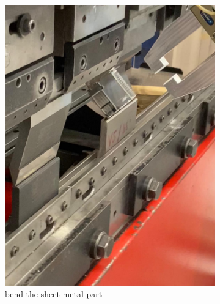 \begin{figure}[h]
\begin{subfigure}[b]{0.32\textwidth}
        \includegraphics[width=\textwidth]{figures/bending/bending6-003.png}
        \caption{bend the sheet metal part}
        \label{subfig:bending6}
    \end{subfigure}\hspace{0.1cm}
    \begin{subfigure}[b]{0.32\textwidth}
        \centering

\end{subfigure}
\end{figure}
